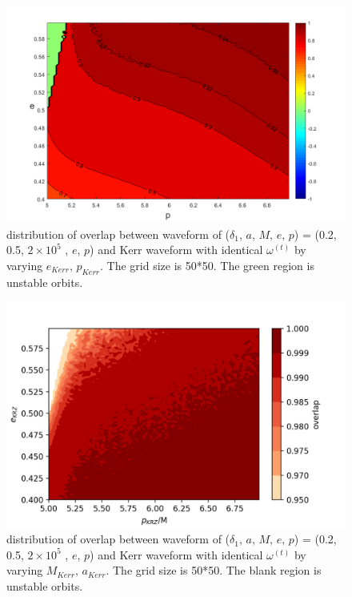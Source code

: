 \documentclass{article}
\begin{document}
	\begin{figure}[!htb]
	\centering
	\includegraphics[width=16cm]{ep_best_dist.png}
	
	\caption{distribution of overlap between waveform of ($\delta_1,\, a,\, M,\, e,\, p$) = (0.2, 0.5, $2 \times 10^5 $ , $e$, $p$) and Kerr waveform with identical $\omega^{(t)}$ by varying $e_{Kerr},\, p_{Kerr}$. The grid size is 50*50. The green region is unstable orbits.}
	\label{epdist}
\end{figure}	

	\begin{figure}[!htb]
	\centering
	\includegraphics[width=16cm]{FF_am.png}
	
	\caption{distribution of overlap between waveform of ($\delta_1,\, a,\, M,\, e,\, p$) = (0.2, 0.5, $2 \times 10^5 $ , $e$, $p$) and Kerr waveform with identical $\omega^{(t)}$ by varying $M_{Kerr},\, a_{Kerr}$. The grid size is 50*50. The blank region is unstable orbits.}
	\label{amdist}
\end{figure}	
\end{document}

